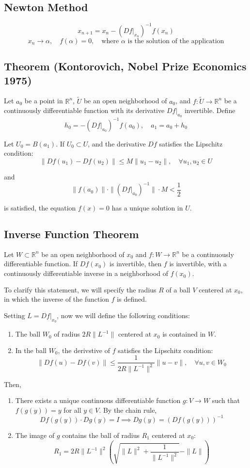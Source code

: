 \documentclass[11pt]{article}
\begin{document}
\subsection{Newton Method}
\[
x_{n+1} = x_n - (Df\big|_{x_n})^{-1} f(x_n)
\]
\[
x_n \rightarrow \alpha, \quad f(\alpha) = 0, \quad \text{where } \alpha \text{ is the solution of the application}
\]

\subsection{Theorem (Kontorovich, Nobel Prize Economics 1975)}
Let $a_0$ be a point in $\mathbb{R}^n$, $\tilde{U}$ be an open neighborhood of $a_0$, and $f : \tilde{U} \rightarrow \mathbb{R}^n$ be a continuously differentiable function with its derivative $Df\big|_{a_0}$ invertible. Define 
\[
h_0 = - (Df\big|_{a_0})^{-1} f(a_0), \quad a_1 = a_0 + h_0
\]

Let $U_0 = B(a_1)$. If $U_0 \subset U$, and the derivative $Df$ satisfies the Lipschitz condition: 
\[
\| Df(u_1) - Df(u_2) \| \leq M \| u_1 - u_2 \|, \quad \forall u_1, u_2 \in U
\]

and
\[
\|f(a_0)\| \cdot \| (Df\big|_{a_0})^{-1} \| \cdot M < \frac{1}{2}
\]

is satisfied, the equation $f(x) = 0$ has a unique solution in $U$.

\subsection{Inverse Function Theorem}
Let $W \subset \mathbb{R}^n$ be an open neighborhood of $x_0$ and $f : W \rightarrow \mathbb{R}^n$ be a continuously differentiable function. If $Df(x_0)$ is invertible, then $f$ is invertible, with a continuously differentiable inverse in a neighborhood of $f(x_0)$.

To clarify this statement, we will specify the radius $R$ of a ball $V$ centered at $x_0$, in which the inverse of the function $f$ is defined.

Setting $L = Df\big|_{x_0}$, now we will define the following conditions:
\begin{enumerate}
    \item The ball $W_0$ of radius $2R \| L^{-1} \|$ centered at $x_0$ is contained in $W$.
    \item In the ball $W_0$, the derivstive of $f$ satisfies the Lipschitz condition:
    \[
    \|Df(u) - Df(v)\| \leq \frac{1}{2R \|L^{-1}\|^2} \|u - v\|, \quad \forall u,v \in W_0
    \]
\end{enumerate}

Then,
\begin{enumerate}
    \item There exists a unique continuous differentiable function $g : V \rightarrow W$ such that $f(g(y)) = y$ for all $y \in V$. By the chain rule,
    \[
    Df(g(y)) \cdot Dg(y) = I \implies Dg(y) = (Df(g(y)))^{-1}
    \]
    \item The image of $g$ contains the ball of radius $R_1$ centered at $x_0$:
    \[
    R_1 = 2R \|L^{-1}\|^2 \left( \sqrt{\|L\|^2 + \frac{1}{\|L^{-1}\|^2}} - \|L\| \right)
    \]
\end{enumerate}
\end{document}
